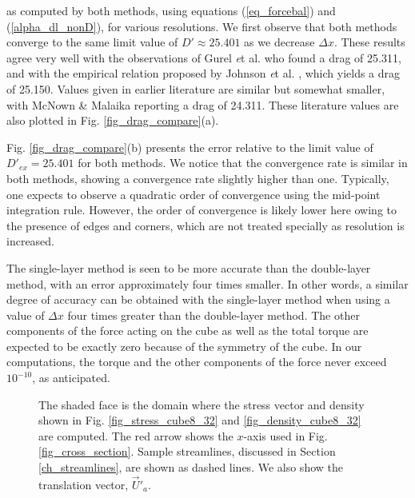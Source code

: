 as computed by both methods, using equations (\ref{eq_forcebal}) and (\ref{alpha_dl_nonD}), for various resolutions. We first observe that both methods converge to the same limit value of $D'  \approx 25.401$ as we decrease $\Delta x$.
These results agree very well with the observations of
Gurel {\textit et al.} 
\cite{gurel_studies_1955} who found a drag of 25.311, and with the empirical relation proposed by 
Johnson {\textit et al.} 
\cite{johnson_drag_1987}, which yields a drag of 25.150. Values given in earlier literature are similar but somewhat smaller, with 
 McNown \& Malaika  \cite{mcnown_effects_1950} 
reporting a drag of 24.311. These literature values are also plotted in  Fig. \ref{fig_drag_compare}(a).
\par
Fig. \ref{fig_drag_compare}(b) presents the error relative to the limit value of $D'_{ex}  = 25.401$ for both methods.
We notice that the convergence rate is similar in both methods, showing a convergence rate slightly higher than one. 
 Typically, one expects to observe a quadratic order of convergence using the mid-point integration rule. However, the order of convergence is likely lower here owing to the presence of edges and corners, which are not treated specially as resolution is increased.
 \par
The single-layer method is seen to be more accurate than the double-layer method, with an error approximately four times smaller. In other words, a similar degree of accuracy can be obtained with the single-layer method when using a value of $\Delta x$ four times greater than the double-layer method.
The other components of the force acting on the cube as well as the total torque are expected to be exactly zero because of the symmetry of the cube.
In our computations, the torque and the other components of the force never exceed $10^{-10}$, as anticipated. 

\begin{figure}[ht]
	\begin{center}
	\end{center}
	\caption{The shaded face is the domain where the stress vector and density shown in Fig. \ref{fig_stress_cube8_32} and	\ref{fig_density_cube8_32} are computed. The red arrow shows the $x$-axis used in Fig.  \ref{fig_cross_section}. Sample  streamlines, discussed in Section \ref{ch_streamlines}, are shown as dashed lines. We also show the translation vector,  $\vec{U}'_a$.}
	\label{fig_face_description}
\end{figure}


